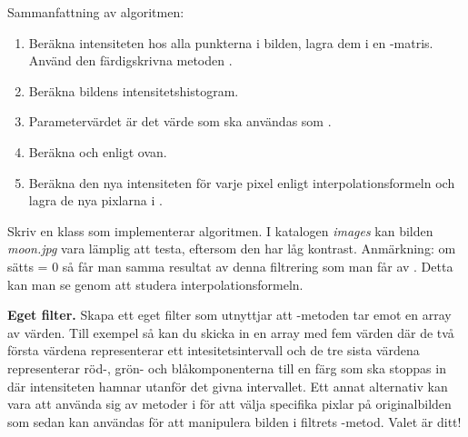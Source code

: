 Sammanfattning av algoritmen:
\begin{enumerate}
	\item Beräkna intensiteten hos alla punkterna i bilden, lagra dem i en -matris. Använd den färdigskrivna metoden .
	\item Beräkna bildens intensitetshistogram.
	\item Parametervärdet  är det värde som ska användas som .
	\item Beräkna  och  enligt ovan.
	\item Beräkna den nya intensiteten för varje pixel enligt interpolationsformeln och lagra de nya pixlarna i .
\end{enumerate}
Skriv en klass  som implementerar algoritmen. I katalogen \emph{images} kan bilden \emph{moon.jpg} vara lämplig att testa, eftersom den har låg kontrast. Anmärkning: om  sätts = 0 så får man samma resultat av denna filtrering som man får av . Detta kan man se genom att studera interpolationsformeln.

\Task \textbf{Eget filter.} Skapa ett eget filter som utnyttjar att -metoden tar emot en array av värden. Till exempel så kan du skicka in en array med fem värden där de två första värdena representerar ett intesitetsintervall och de tre sista värdena representerar röd-, grön- och blåkomponenterna till en färg som ska stoppas in där intensiteten hamnar utanför det givna intervallet. Ett annat alternativ kan vara att använda sig av metoder i  för att välja specifika pixlar på originalbilden som sedan kan användas för att manipulera bilden i filtrets -metod. Valet är ditt!

